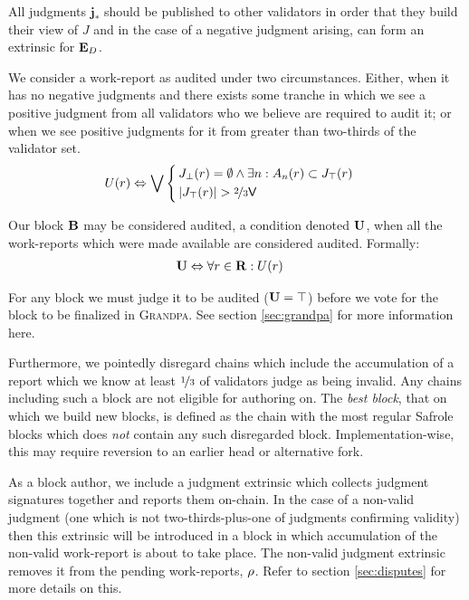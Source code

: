 All judgments $\mathbf{j}_*$ should be published to other validators in order that they build their view of $J$ and in the case of a negative judgment arising, can form an extrinsic for $\mathbf{E}_D$.

We consider a work-report as audited under two circumstances. Either, when it has no negative judgments and there exists some tranche in which we see a positive judgment from all validators who we believe are required to audit it; or when we see positive judgments for it from greater than two-thirds of the validator set.
\begin{align}
  U(\wrX) &\Leftrightarrow \bigvee\,\abracegroup[\,]{
    &J_\bot(\wrX) = \emptyset \wedge \exists n : A\sub{n}(\wrX) \subset J_\top(\wrX) \\
    &|J_\top(\wrX)| > \twothirds\valcount
  }
\end{align}

Our block $\mathbf{B}$ may be considered audited, a condition denoted $\mathbf{U}$, when all the work-reports which were made available are considered audited. Formally:
\begin{align}
  \mathbf{U} &\Leftrightarrow \forall r \in \mathbf{R} : U(r)
\end{align}

For any block we must judge it to be audited (\ie $\mathbf{U} = \top$) before we vote for the block to be finalized in \textsc{Grandpa}. See section \ref{sec:grandpa} for more information here.

Furthermore, we pointedly disregard chains which include the accumulation of a report which we know at least $\nicefrac{1}{3}$ of validators judge as being invalid. Any chains including such a block are not eligible for authoring on. The \emph{best block}, \ie that on which we build new blocks, is defined as the chain with the most regular Safrole blocks which does \emph{not} contain any such disregarded block. Implementation-wise, this may require reversion to an earlier head or alternative fork.

As a block author, we include a judgment extrinsic which collects judgment signatures together and reports them on-chain. In the case of a non-valid judgment (\ie one which is not two-thirds-plus-one of judgments confirming validity) then this extrinsic will be introduced in a block in which accumulation of the non-valid work-report is about to take place. The non-valid judgment extrinsic removes it from the pending work-reports, $\rho$. Refer to section \ref{sec:disputes} for more details on this.


